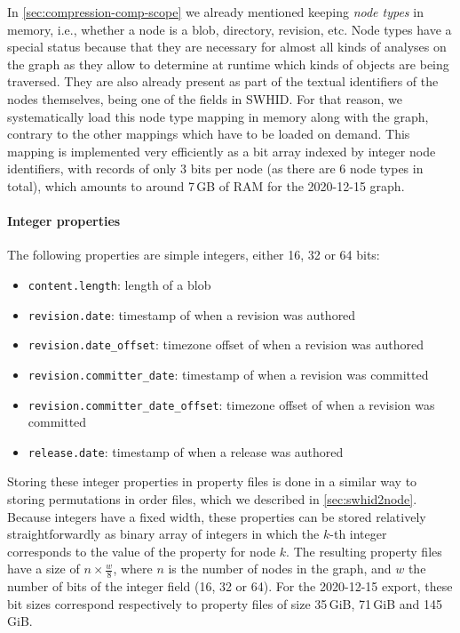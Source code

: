 In \cref{sec:compression-comp-scope} we already mentioned keeping \emph{node
types} in memory, i.e., whether a node is a blob, directory, revision, etc.
Node types have a special status because that they are necessary for almost all
kinds of analyses on the graph as they allow to determine at runtime which
kinds of objects are being traversed. They are also
already present as part of the textual identifiers of the nodes themselves,
being one of the fields in \gls{SWHID}. For that reason, we systematically
load this node type mapping in memory along with the graph, contrary to the
other mappings which have to be loaded on demand.
This mapping is implemented very efficiently as a bit array indexed by integer
node identifiers, with records of only 3 bits per node (as there are 6 node
types in total), which amounts to around 7\,GB of RAM for the 2020-12-15 graph.

\paragraph{Integer properties}

The following properties are simple integers, either 16, 32 or 64 bits:

\begin{itemize}
    \setlength\itemsep{0em}
    \item \texttt{content.length}: length of a blob
    \item \texttt{revision.date}: timestamp of when a revision was authored
    \item \texttt{revision.date\_offset}: timezone offset of when a revision
        was authored
    \item \texttt{revision.committer\_date}: timestamp of when a revision was
        committed
    \item \texttt{revision.committer\_date\_offset}: timezone offset of when a
        revision was committed
    \item \texttt{release.date}: timestamp of when a release was authored
\end{itemize}

Storing these integer properties in property files is done in a similar way
to storing permutations in order files, which we described in
\cref{sec:swhid2node}. Because integers have a fixed width, these properties
can be stored relatively straightforwardly as binary array of integers in which
the $k$-th integer corresponds to the value of the property for node $k$.  The
resulting property files have a size of {\Large $n \times \frac{w}{8}$}, where
$n$ is the number of nodes in the graph, and $w$ the number of bits of the
integer field (16, 32 or 64). For the 2020-12-15 export, these bit sizes
correspond respectively to property files of size 35\,GiB, 71\,GiB and
145\,GiB.

